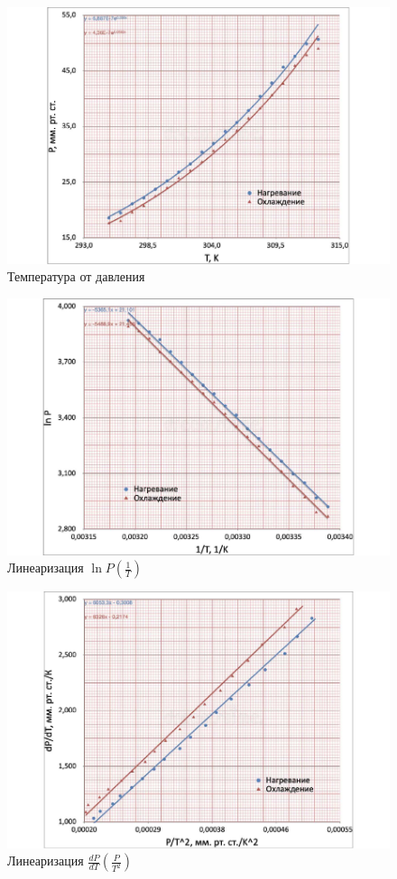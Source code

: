 \documentclass[12pt,a4paper]{article}
\begin{document}
\begin{figure}
	\centering
	\includegraphics[width=1\linewidth]{"P(T)"}
	\caption{Температура от давления}
	\label{fig:pot}
\end{figure}

\begin{figure}
	\centering
	\includegraphics[width=1\linewidth]{"lnP(T)"}
	\caption{Линеаризация $\ln{P}(\frac{1}{T})$}
	\label{fig:lnpot}
\end{figure}

\begin{figure}
	\centering
	\includegraphics[width=1\linewidth]{"dpdt"}
	\caption{Линеаризация $\frac{dP}{dT}(\frac{P}{T^2})$}
	\label{fig:dpdt}
\end{figure}
\end{document}
